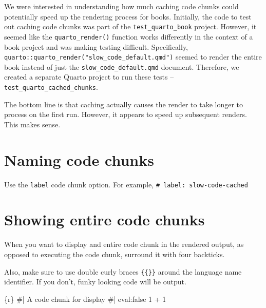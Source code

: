 \documentclass[
  letterpaper,
  DIV=11,
  numbers=noendperiod]{scrreprt}
\newenvironment{Shaded}{\begin{snugshade}}{\end{snugshade}}
\newcommand{\InformationTok}[1]{\textcolor[rgb]{0.37,0.37,0.37}{#1}}
\begin{document}
We were interested in understanding how much caching code chunks could
potentially speed up the rendering process for books. Initially, the
code to test out caching code chunks was part of the
\texttt{test\_quarto\_book} project. However, it seemed like the
\texttt{quarto\_render()} function works differently in the context of a
book project and was making testing difficult. Specifically,
\texttt{quarto::quarto\_render("slow\_code\_default.qmd")} seemed to
render the entire book instead of just the
\texttt{slow\_code\_default.qmd} document. Therefore, we created a
separate Quarto project to run these tests --
\texttt{test\_quarto\_cached\_chunks}.

The bottom line is that caching actually causes the render to take
longer to process on the first run. However, it appears to speed up
subsequent renders. This makes sense.

\section{Naming code chunks}\label{naming-code-chunks}

Use the \texttt{label} code chunk option. For example,
\texttt{\#\textbar{}\ label:\ slow-code-cached}

\section{Showing entire code chunks}\label{showing-entire-code-chunks}

When you want to display and entire code chunk in the rendered output,
as opposed to executing the code chunk, surround it with four backticks.

Also, make sure to use double curly braces \texttt{\{\{\}\}} around the
language name identifier. If you don't, funky looking code will be
output.

\begin{Shaded}
\begin{Highlighting}[]
\InformationTok{\textasciigrave{}\textasciigrave{}\textasciigrave{}\textasciigrave{}}
\InformationTok{\textasciigrave{}\textasciigrave{}\textasciigrave{}\{r\}}
\InformationTok{\#| A code chunk for display}
\InformationTok{\#| eval:false}
\InformationTok{1 + 1}
\InformationTok{\textasciigrave{}\textasciigrave{}\textasciigrave{}}
\InformationTok{\textasciigrave{}\textasciigrave{}\textasciigrave{}\textasciigrave{}}
\end{Highlighting}
\end{Shaded}
\end{document}
